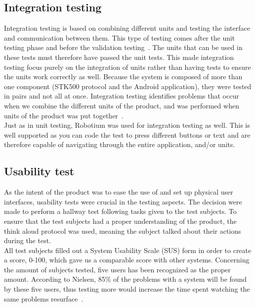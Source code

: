 		\subsection{Integration testing}
		Integration testing is based on combining different units and testing the interface and communication between them. This type of testing comes after the unit testing phase and before the validation testing~\cite{validation-testing}. The units that can be used in these tests must therefore have passed the unit tests. This made integration testing focus purely on the integration of units rather than having tests to ensure the units work correctly as well. Because the system is composed of more than one component (STK500 protocol and the Android application), they were tested in pairs and not all at once. Integration testing identifies problems that occur when we combine the different units of the product, and was performed when units of the product was put together~\cite{integration-testing2}.\\
		\newline
		Just as in unit testing, Robotium was used for integration testing as well. This is well supported as you can code the test to press different buttons or text and are therefore capable of navigating through the entire application, and/or units.\\

		\subsection{Usability test}
		As the intent of the product was to ease the use of and set up physical user interfaces, usability tests were crucial in the testing aspects. The decision were made to perform a hallway test following tasks given to the test subjects. To ensure that the test subjects had a proper understanding of the product, the think aloud protocol was used, meaning the subject talked about their actions during the test.\\
		\newline
		All test subjects filled out a System Usability Scale (SUS) form in order to create a score, 0-100, which gave us a comparable score with other systems. Concerning the amount of subjects tested, five users has been recognized as the proper amount. According to Nielsen, 85\% of the problems with a system will be found by these five users, thus testing more would increase the time spent watching the same problems resurface~\cite{Nielsen}.

